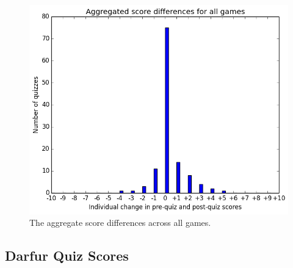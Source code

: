 			\begin{figure}[] 
			\centering 
			\includegraphics[width=\textwidth]{general_results.png} 
			\caption{The aggregate score differences across all games.}
			\end{figure}

			\clearpage

		\subsection{Darfur Quiz Scores}

